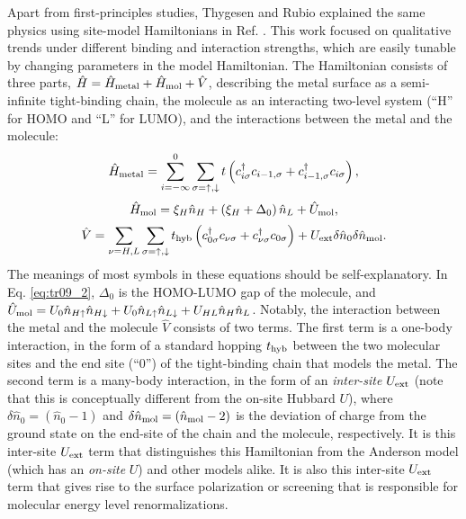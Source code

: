 \documentclass[aip, amsmath, amssymb, reprint, longbibliography]{revtex4-2}
\begin{document}
Apart from first-principles studies, Thygesen and Rubio explained the same physics using site-model Hamiltonians in Ref. . This work focused on qualitative trends under different binding and interaction strengths, which are easily tunable by changing parameters in the model Hamiltonian. The Hamiltonian consists of three parts, $\hat{H}=\hat{H}_{\rm metal}+\hat{H}_{\rm mol}+\hat{V}$, describing the metal surface as a semi-infinite tight-binding chain, the molecule as an interacting two-level system (``H'' for HOMO and ``L'' for LUMO), and the interactions between the metal and the molecule:
\begin{equation}
\hat{H}_{\rm metal}=\sum_{i=-\infty}^{0}\sum_{\sigma=\uparrow,\downarrow}t\left(c_{i\sigma}^\dagger c_{i-1,\sigma}+c^\dagger_{i-1,\sigma}c_{i\sigma}\right),
\label{eq:tr09_1}
\end{equation}
\begin{equation}
\hat{H}_{\rm mol}=\xi_H\hat{n}_H+\left(\xi_H+\Delta_0\right)\hat{n}_L+\hat{U}_{\rm mol},
\label{eq:tr09_2}
\end{equation}
\begin{equation}
\hat{V}=\sum_{\nu=H,L}\sum_{\sigma=\uparrow,\downarrow}t_{\rm hyb}\left(c_{0\sigma}^\dagger c_{\nu\sigma}+c^\dagger_{\nu\sigma}c_{0\sigma}\right)+U_{\rm ext}\delta\hat{n}_{0}\delta\hat{n}_{\rm mol}.
\label{eq:tr09_3}
\end{equation}
The meanings of most symbols in these equations should be self-explanatory. In Eq. \eqref{eq:tr09_2}, $\Delta_0$ is the HOMO-LUMO gap of the molecule, and $\hat{U}_{\rm mol}=U_0\hat{n}_{H\uparrow}\hat{n}_{H\downarrow}+U_0\hat{n}_{L\uparrow}\hat{n}_{L\downarrow}+U_{HL}\hat{n}_{H}\hat{n}_{L}$. Notably, the interaction between the metal and the molecule $\hat{V}$ consists of two terms. The first term is a one-body interaction, in the form of a standard hopping $t_{\rm hyb}$ between the two molecular sites and the end site (``0'') of the tight-binding chain that models the metal. The second term is a many-body interaction, in the form of an \emph{inter-site} $U_{\rm ext}$ (note that this is conceptually different from the on-site Hubbard $U$), where $\delta \hat{n}_0=(\hat{n}_0-1)$ and $\delta \hat{n}_{\rm mol}=(\hat{n}_{\rm mol}-2)$ is the deviation of charge from the ground state on the end-site of the chain and the molecule, respectively. It is this inter-site $U_{\rm ext}$ term that distinguishes this Hamiltonian from the Anderson model \cite{A61} (which has an \emph{on-site} $U$) and other models alike. It is also this inter-site $U_{\rm ext}$ term that gives rise to the surface polarization or screening that is responsible for molecular energy level renormalizations.
\end{document}
